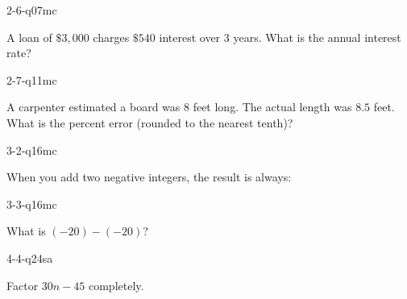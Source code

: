 \documentclass[12pt, fleqn, openany]{studyGuide}
\begin{document}
\begin{practiceQuestion}{2-6-q07}{mc}
\begin{questionText}
A loan of $\$3{,}000$ charges $\$540$ interest over $3$ years. What is the annual interest rate?
\end{questionText}
\end{practiceQuestion}

\begin{practiceQuestion}{2-7-q11}{mc}
\begin{questionText}
A carpenter estimated a board was $8$ feet long. The actual length was $8.5$ feet. What is the percent error (rounded to the nearest tenth)?
\end{questionText}
\end{practiceQuestion}

\begin{practiceQuestion}{3-2-q16}{mc}
\begin{questionText}
When you add two negative integers, the result is always:
\end{questionText}
\end{practiceQuestion}

\begin{practiceQuestion}{3-3-q16}{mc}
\begin{questionText}
What is $(-20) - (-20)$?
\end{questionText}
\end{practiceQuestion}

\begin{practiceQuestion}{4-4-q24}{sa}
\begin{questionText}
Factor $30n - 45$ completely.
\end{questionText}
\end{practiceQuestion}
\end{document}
